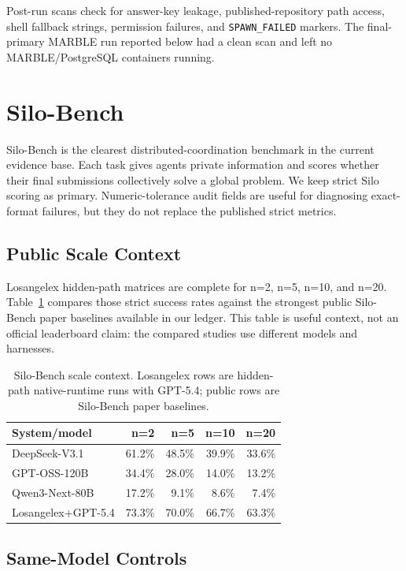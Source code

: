 \documentclass[10pt,twocolumn]{article}
\begin{document}
Post-run scans check for answer-key leakage, published-repository path access, shell fallback strings, permission failures, and \texttt{SPAWN\_FAILED} markers. The final-primary MARBLE run reported below had a clean scan and left no MARBLE/PostgreSQL containers running.

\section{Silo-Bench}

Silo-Bench is the clearest distributed-coordination benchmark in the current evidence base. Each task gives agents private information and scores whether their final submissions collectively solve a global problem. We keep strict Silo scoring as primary. Numeric-tolerance audit fields are useful for diagnosing exact-format failures, but they do not replace the published strict metrics.

\subsection{Public Scale Context}

Losangelex hidden-path matrices are complete for n=2, n=5, n=10, and n=20. Table~\ref{tab:silo-public} compares those strict success rates against the strongest public Silo-Bench paper baselines available in our ledger. This table is useful context, not an official leaderboard claim: the compared studies use different models and harnesses.

\begin{table}[t]
\centering
\scriptsize
\caption{Silo-Bench scale context. Losangelex rows are hidden-path native-runtime runs with GPT-5.4; public rows are Silo-Bench paper baselines.}
\begin{tabularx}{\columnwidth}{@{}lrrrr@{}}
\toprule
System/model & n=2 & n=5 & n=10 & n=20 \\
\midrule
DeepSeek-V3.1 & 61.2\% & 48.5\% & 39.9\% & 33.6\% \\
GPT-OSS-120B & 34.4\% & 28.0\% & 14.0\% & 13.2\% \\
Qwen3-Next-80B & 17.2\% & 9.1\% & 8.6\% & 7.4\% \\
Losangelex+GPT-5.4 & 73.3\% & 70.0\% & 66.7\% & 63.3\% \\
\bottomrule
\end{tabularx}
\label{tab:silo-public}
\end{table}

\subsection{Same-Model Controls}
\end{document}
